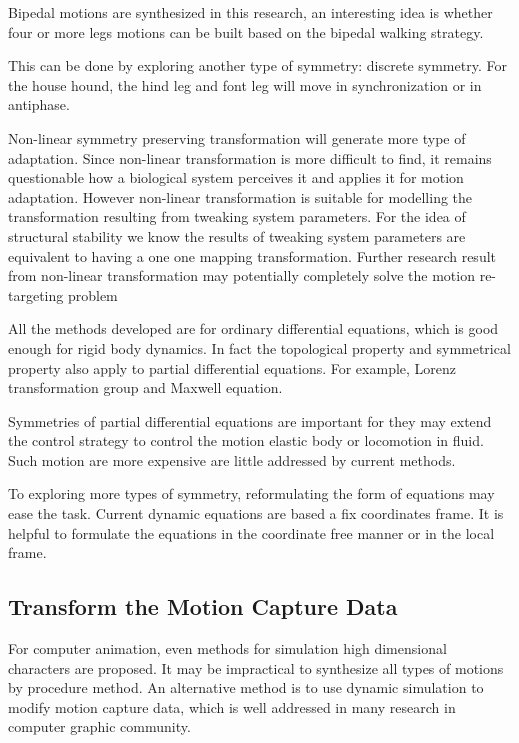\begin{itemize}

Bipedal motions are synthesized in this research, an interesting idea is whether four or more legs motions can be built based on the bipedal walking strategy.

This can be done by exploring another type of symmetry: discrete symmetry.
For the house hound, the hind leg and font leg will move in synchronization or in antiphase.




Non-linear symmetry preserving transformation will generate more type of adaptation.
Since non-linear transformation is more difficult to find, it remains questionable how a biological system perceives it and applies it for motion adaptation.
However non-linear transformation is suitable for modelling the transformation  resulting from tweaking system parameters.
For the idea of structural stability we know the results of tweaking system parameters are equivalent to having a one one mapping transformation.
Further research result from non-linear transformation may potentially completely solve the motion re-targeting problem 



All the methods developed are for  ordinary differential equations, which is good enough for rigid body dynamics.
In fact the topological property and symmetrical property also apply to partial differential equations.
For example,  Lorenz transformation group and Maxwell equation.

Symmetries of partial differential equations are important for they may extend the control strategy  to control the motion elastic body or locomotion in fluid.
Such motion are more expensive are little addressed by current \cms methods.


\end{itemize}

To exploring more types of symmetry, reformulating the form of equations may ease the task.
Current dynamic equations are based a fix coordinates frame.
It is helpful to formulate the equations in the coordinate free manner or in the local frame.






\subsection{Transform the Motion Capture Data}
For computer animation, even methods for simulation high dimensional characters are proposed.
It may be impractical to synthesize all types of motions by procedure method.
An alternative method is to use dynamic simulation to modify motion capture data, which is well addressed in many research in computer graphic community.



